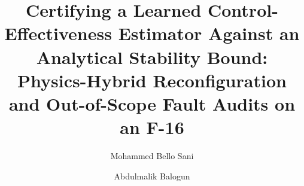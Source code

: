 \documentclass[review,12pt]{elsarticle}
\begin{document}
\begin{frontmatter}

\title{Certifying a Learned Control-Effectiveness Estimator Against an Analytical Stability Bound: Physics-Hybrid Reconfiguration and Out-of-Scope Fault Audits on an F-16}

\author[phi-lab]{Mohammed Bello Sani}

\author[phi-lab]{Abdulmalik Balogun}

\address[phi-lab]{Physics Hybrid Integrity Lab, Department of Digital Intelligence Maintenance for Aircraft Systems, Abuja, Nigeria}

\begin{abstract}

\end{abstract}
\end{frontmatter}
\end{document}
